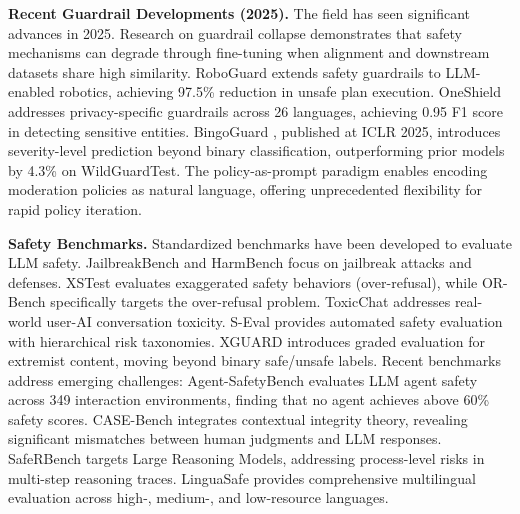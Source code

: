 \documentclass{article}
\begin{document}
\textbf{Recent Guardrail Developments (2025).} The field has seen significant advances in 2025. Research on guardrail collapse \cite{yang2025guardrail_collapse} demonstrates that safety mechanisms can degrade through fine-tuning when alignment and downstream datasets share high similarity. RoboGuard \cite{zhang2025roboguard} extends safety guardrails to LLM-enabled robotics, achieving 97.5\% reduction in unsafe plan execution. OneShield \cite{chen2025oneshield} addresses privacy-specific guardrails across 26 languages, achieving 0.95 F1 score in detecting sensitive entities. BingoGuard \cite{liu2025bingoguard}, published at ICLR 2025, introduces severity-level prediction beyond binary classification, outperforming prior models by 4.3\% on WildGuardTest. The policy-as-prompt paradigm \cite{sun2025policy_prompt} enables encoding moderation policies as natural language, offering unprecedented flexibility for rapid policy iteration.

\textbf{Safety Benchmarks.} Standardized benchmarks have been developed to evaluate LLM safety. JailbreakBench \cite{chao2024jailbreakbench} and HarmBench \cite{mazeika2024harmbench} focus on jailbreak attacks and defenses. XSTest \cite{rottger2024xstest} evaluates exaggerated safety behaviors (over-refusal), while OR-Bench \cite{cui2024orbench} specifically targets the over-refusal problem. ToxicChat \cite{vidgen2024toxicchat} addresses real-world user-AI conversation toxicity. S-Eval \cite{zeng2024seval} provides automated safety evaluation with hierarchical risk taxonomies. XGUARD \cite{wang2024xguard} introduces graded evaluation for extremist content, moving beyond binary safe/unsafe labels. Recent benchmarks address emerging challenges: Agent-SafetyBench \cite{zhang2024agent_safetybench} evaluates LLM agent safety across 349 interaction environments, finding that no agent achieves above 60\% safety scores. CASE-Bench \cite{wang2025casebench} integrates contextual integrity theory, revealing significant mismatches between human judgments and LLM responses. SafeRBench \cite{liu2025saferbench} targets Large Reasoning Models, addressing process-level risks in multi-step reasoning traces. LinguaSafe \cite{wu2025linguasafe} provides comprehensive multilingual evaluation across high-, medium-, and low-resource languages.
\end{document}
